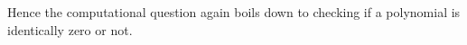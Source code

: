 Hence the computational question again boils down to checking if a polynomial
is identically zero or not.


